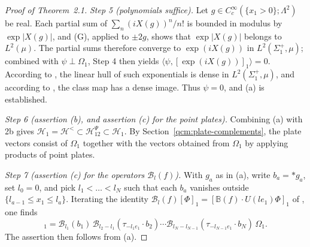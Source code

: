 \documentclass[11pt,letterpaper,reqno]{amsart}
\theoremstyle{definition}
\begin{document}
\begin{proof}[Proof of Theorem~2.1]
\emph{Step 5 (polynomials suffice).}
Let $g\in C_c^\infty(\{x_1>0\};\Lambda^2)$ be real.
Each partial sum of $\sum_n(iX(g))^n/n!$ is bounded in modulus by $\exp|X(g)|$, and (G), applied to $\pm2g$, shows that $\exp|X(g)|$ belongs to $L^2(\mu)$.
The partial sums therefore converge to $\exp(iX(g))$ in $L^2(\Sigma_1^+,\mu)$; combined with $\psi\perp\Omega_1$, Step 4 then yields $\langle\psi,[\exp(iX(g))]_1\rangle=0$.
According to \cite[Sections~5.2 and~7.4]{QEDConstruction}, the linear hull of such exponentials is dense in $L^2(\Sigma_1^+,\mu)$, and according to \cite[Sections~5.2 and~7.4]{QEDConstruction}, the class map has a dense image.
Thus $\psi=0$, and (a) is established.

\emph{Step 6 (assertion (b), and assertion (c) for the point plates).}
Combining (a) with 2b gives $\mathcal H_1=\allowbreak \mathcal H^{<}\subset\mathcal H^{\Psi}_{12}\subset\mathcal H_1$.
By Section~\ref{qcm:plate-complements}, the plate vectors consist of $\Omega_1$ together with the vectors obtained from $\Omega_1$ by applying products of point plates.

\emph{Step 7 (assertion (c) for the operators $\mathcal B_l(f)$).}
With $g_a$ as in (a), write $b_a=\ast g_a$, set $l_0=0$, and pick $l_1<\dots<l_N$ such that each $b_a$ vanishes outside $\{l_{a-1}\le x_1\le l_a\}$.
Iterating the identity $\mathcal B_l(f)[\Phi]_1=[\mathbb B(f)\cdot U(le_1)\Phi]_1$ of \cite[Proposition~8.1]{QEDConstruction}, one finds
\begin{equation*}
[X(g_1)\cdots X(g_N)]_1=\mathcal B_{l_1}(b_1)\,\mathcal B_{l_2-l_1}(\tau_{-l_1e_1}\cdot b_2)\cdots\mathcal B_{l_N-l_{N-1}}(\tau_{-l_{N-1}e_1}\cdot b_N)\,\Omega_1.
\end{equation*}
The assertion then follows from (a).
\end{proof}
\end{document}
